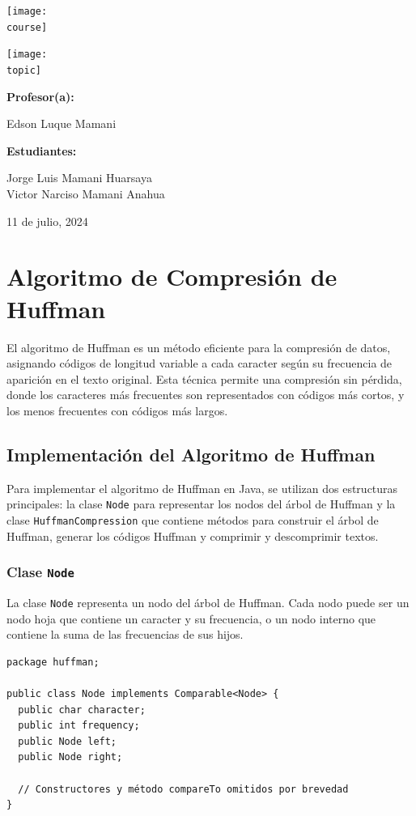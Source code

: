 \documentclass[10pt, a4paper]{article}
\newcommand{\mj}[1]{\texttt{#1}}
\newcommand{\course}{img/data_structures.png}
\newcommand{\topic}{img/huffman.png}
\newcommand{\professor}{Edson Luque Mamani}
\newcommand{\students}{Jorge Luis Mamani Huarsaya\\Victor Narciso Mamani Anahua}
\newcommand{\mydate}{11 de julio, 2024}
\begin{document}
\begin{titlepage}
	\centering
	\texttt{[image: \\course]} \par
  \vfill \vfill
	\texttt{[image: \\topic]}\par
  \vfill \vfill
  {\textbf{Profesor(a):} \par}
	\professor \vfill
  {\textbf{Estudiantes:} \par}
	\students \vfill
	{\large \mydate \par}
\end{titlepage}

\section{Algoritmo de Compresión de Huffman}

El algoritmo de Huffman es un método eficiente para la compresión de datos, asignando códigos de longitud variable a cada caracter según su frecuencia de aparición en el texto original. Esta técnica permite una compresión sin pérdida, donde los caracteres más frecuentes son representados con códigos más cortos, y los menos frecuentes con códigos más largos.

\subsection{Implementación del Algoritmo de Huffman}

Para implementar el algoritmo de Huffman en Java, se utilizan dos estructuras principales: la clase \mj{Node} para representar los nodos del árbol de Huffman y la clase \mj{HuffmanCompression} que contiene métodos para construir el árbol de Huffman, generar los códigos Huffman y comprimir y descomprimir textos.

\subsubsection{Clase \mj{Node}}

La clase \mj{Node} representa un nodo del árbol de Huffman. Cada nodo puede ser un nodo hoja que contiene un caracter y su frecuencia, o un nodo interno que contiene la suma de las frecuencias de sus hijos.

\begin{verbatim}
package huffman;

public class Node implements Comparable<Node> {
  public char character;
  public int frequency;
  public Node left;
  public Node right;

  // Constructores y método compareTo omitidos por brevedad
}
\end{verbatim}
\end{document}

